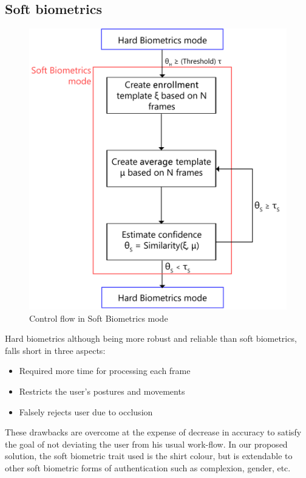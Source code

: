 \documentclass[%
        submission,
        notitlepage,
        narroweqnarray,
        inline,
        ]{ieee}
\begin{document}
\subsection{Soft biometrics}
\begin{figure}[h!]
	\centering
	\includegraphics[scale=0.5]{img/soft_f.png}
	\caption{Control flow in Soft Biometrics mode}
	\label{fig:cfsb}
\end{figure}
Hard biometrics although being more robust and reliable than soft biometrics, falls short in three aspects\cite{Niin10}:
\begin{itemize}
	\item Required more time for processing each frame
	\item Restricts the user's postures and movements
	\item Falsely rejects user due to occlusion
\end{itemize}
These drawbacks are overcome at the expense of decrease in accuracy to satisfy the goal of not deviating the user from his usual work-flow. 
In our proposed solution, the soft biometric trait used is the shirt colour, but is extendable to other soft biometric forms of authentication such as complexion, gender\cite{Jain204}, etc. 
\end{document}
